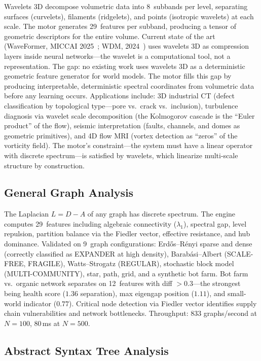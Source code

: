\documentclass[11pt]{amsart}
\begin{document}
Wavelets 3D decompose volumetric data into 8~subbands per level, separating
surfaces (curvelets), filaments (ridgelets), and points (isotropic wavelets)
at each scale. The motor generates 29~features per subband, producing a
tensor of geometric descriptors for the entire volume. Current state of the
art (WaveFormer, MICCAI 2025~\cite{WaveFormer2025}; WDM,
2024~\cite{WDM2024}) uses wavelets 3D as compression layers inside neural
networks---the wavelet is a computational tool, not a representation. The
gap: no existing work uses wavelets 3D as a deterministic geometric feature
generator for world models. The motor fills this gap by producing
interpretable, deterministic spectral coordinates from volumetric data before
any learning occurs. Applications include: 3D industrial CT (defect
classification by topological type---pore vs.\ crack vs.\ inclusion),
turbulence diagnosis via wavelet scale decomposition (the Kolmogorov cascade
is the ``Euler product'' of the flow), seismic interpretation (faults,
channels, and domes as geometric primitives), and 4D flow MRI (vortex
detection as ``zeros'' of the vorticity field). The motor's constraint---the
system must have a linear operator with discrete spectrum---is satisfied by
wavelets, which linearize multi-scale structure by construction.

\subsection{General Graph Analysis}

The Laplacian $L = D - A$ of any graph has discrete spectrum. The engine
computes 29~features including algebraic connectivity ($\lambda_1$), spectral
gap, level repulsion, partition balance via the Fiedler vector, effective
resistance, and hub dominance. Validated on 9~graph configurations:
Erd\H{o}s--R\'enyi sparse and dense (correctly classified as EXPANDER at
high density), Barab\'asi--Albert (SCALE-FREE, FRAGILE), Watts--Strogatz
(REGULAR), stochastic block model (MULTI-COMMUNITY), star, path, grid, and a
synthetic bot farm. Bot farm vs.\ organic network separates on 12~features
with diff $> 0.3$---the strongest being health score ($1.36$ separation),
max eigengap position ($1.11$), and small-world indicator ($0.77$). Critical
node detection via Fiedler vector identifies supply chain vulnerabilities and
network bottlenecks. Throughput: 833 graphs/second at $N=100$, $80\,$ms at
$N=500$.

\subsection{Abstract Syntax Tree Analysis}
\end{document}
